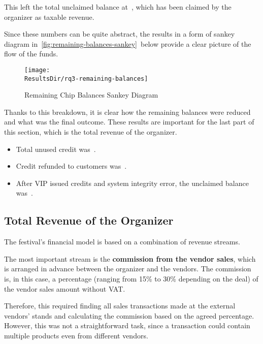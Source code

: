 This left the total unclaimed balance at~, which has been claimed by the organizer as taxable revenue.

Since these numbers can be quite abstract, the results in a form of sankey diagram in~\autoref{fig:remaining-balances-sankey}~below provide a clear picture of the flow of the funds.

\begin{figure}[H]
	\centering
	\texttt{[image: \\ResultsDir/rq3-remaining-balances]}
	\caption{Remaining Chip Balances Sankey Diagram}
	\label{fig:remaining-balances-sankey}
	\source
\end{figure}

Thanks to this breakdown, it is clear how the remaining balances were reduced and what was the final outcome.
These results are important for the last part of this section, which is the total revenue of the organizer.

\begin{keytakeaways}
	\begin{itemize}
		\item Total unused credit was~.
		\item Credit refunded to customers was~.
		\item After VIP issued credits and system integrity error, the unclaimed balance was~.
	\end{itemize}
\end{keytakeaways}


\subsection{Total Revenue of the Organizer}
\label{subsec:analysis-total-revenue}

The festival's financial model is based on a combination of revenue streams.

The most important stream is the \textbf{commission from the vendor sales}, which is arranged in advance between the organizer and the vendors.
The commission is, in this case, a percentage (ranging from 15\% to 30\% depending on the deal) of the vendor sales amount without VAT\@.

Therefore, this required finding all sales transactions made at the external vendors' stands and calculating the commission based on the agreed percentage.
However, this was not a straightforward task, since a transaction could contain multiple products even from different vendors.

